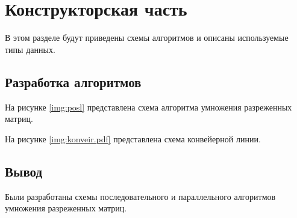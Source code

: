 \chapter{Конструкторская часть}
В этом разделе будут приведены схемы алгоритмов и описаны используемые типы данных.

\section{Разработка алгоритмов}

На рисунке \ref{img:posl} представлена схема алгоритма умножения разреженных матриц.


\FloatBarrier

На рисунке \ref{img:konveir.pdf} представлена схема конвейерной линии.


\section*{Вывод}

Были разработаны схемы последовательного и параллельного алгоритмов умножения разреженных матриц.

